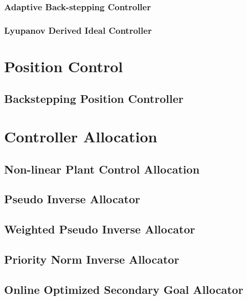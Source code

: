 \subsubsection{Adaptive Back-stepping Controller}
\subsubsection{Lyupanov Derived Ideal Controller}

\section{Position Control}
\subsection{Backstepping Position Controller}

\section{Controller Allocation}
\subsection{Non-linear Plant Control Allocation}
\subsection{Pseudo Inverse Allocator}
\subsection{Weighted Pseudo Inverse Allocator}
\subsection{Priority Norm Inverse Allocator}
\subsection{Online Optimized Secondary Goal Allocator}
